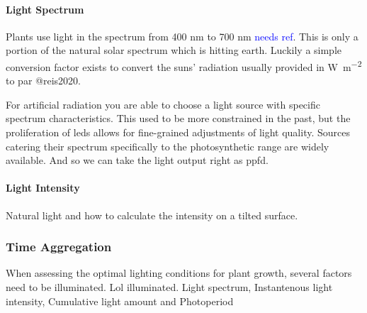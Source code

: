 \paragraph{Light Spectrum}
Plants use light in the spectrum from 400 nm to 700 nm \textcolor{Blue}{needs ref}.
This is only a portion of the natural solar spectrum which is hitting earth.
Luckily a simple conversion factor exists to convert the suns' radiation usually provided in \si{\W\per\square\m} to \ac{par} @reis2020.

For artificial radiation you are able to choose a light source with specific spectrum characteristics.
This used to be more constrained in the past, but the proliferation of \acsp{led} allows for fine-grained adjustments of light quality.
Sources catering their spectrum specifically to the photosynthetic range are widely available.
And so we can take the light output right as \ac{ppfd}.

\paragraph{Light Intensity}
Natural light and how to calculate the intensity on a tilted surface.


\subsubsection{Time Aggregation}
When assessing the optimal lighting conditions for plant growth, several factors need to be illuminated.
Lol illuminated.
Light spectrum, Instantenous light intensity, Cumulative light amount and Photoperiod

